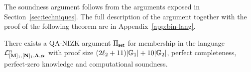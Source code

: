 The soundness argument follows from the arguments exposed in Section~\ref{sec:techniques}. The full description of the argument together with the proof of the following theorem are in Appendix~\ref{app:bin-lang}.

\begin{theorem} \label{theo:aggset} There exists a QA-NIZK argument $\Pi_{\mathsf{set}}$ for membership in the language $\mathcal{L}_{[\mathbf{{M}}]_1,[\mathbf{{N}}]_1,\mathbf{{\Lambda}},{\boldsymbol \alpha}}^n$ with proof size  $(2{\ell_2}+11)|\mathbb{G}_1|+10|\mathbb{G}_2|$, perfect completeness, perfect-zero knowledge and computational soundness. 
\end{theorem}

